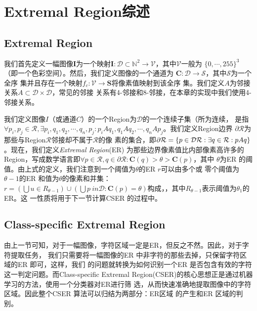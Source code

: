 \section{Extremal Region综述}

\subsection{Extremal Region}

我们首先定义一幅图像$\mathbf{I}$为一个映射$\mathbf{I} : \mathcal{D} \subset
\mathbb{N}^2 \rightarrow \mathcal{V}$，其中$\mathcal{V}$一般为
$\{0,\cdots,255\}^3$（即一个色彩空间）。然后，我们定义图像的一个通道为
$\mathbf{C} : \mathcal{D} \rightarrow \mathcal{S}$，其中$\mathcal{S}$为一个全序
集并且存在一个映射$f_c : \mathcal{V} \rightarrow \mathbf{S}$将像素值映射到该全序
集。我们定义$A$为邻接关系$A \subset \mathcal{D} \times \mathcal{D}$，常见的邻接
关系有4-邻接和8-邻接，在本章的实现中我们使用4-邻接关系。

我们定义图像$I$（或通道$C$）的一个Region为$\mathcal{D}$的一个连续子集（所为连续，
是指$\forall{p_i, p_j \in \mathcal{R}}, \exists{p_i, q_1, q_2, \cdots, q_n,
  p_j} : p_iAq_1, q_1Aq_2,\cdots,q_nAp_j$。我们定义Region边界
$\partial{\mathcal{R}}$为那些与Region$\mathcal{R}$邻接却不属于$\mathcal{R}$的像
素的集合，即$\partial{\mathcal{R}} = \{p \in \mathcal{D} \\ \mathcal{R} :
\exists{q \in \mathcal{R}} : pAq \}$。现在，我们定义\textit{Extremal Region}(ER)
为那些边界像素值比内部像素高许多的Region，写成数学语言即$\forall{p \in
  \mathcal{R}}, q \in \partial{\mathcal{R}} : \mathbf{C}(q) > \theta > \mathbf{C}(p)$，其中
$\theta$为ER 的阈值。由上式的定义，我们注意到一个阈值为$\theta$的ER $r$可以由多个或
零个阈值为$\theta - 1$的ER 和值为$\theta$的像素和并集：$r = \left( \bigcup{u \in
    R_{\theta-1}} \right) \cup \left( \bigcup{p \ in \mathcal{D} : \mathbf{C}(p)
  = \theta} \right)$构成，，其中\(R_{\theta-1}\)表示阈值为\(\theta_1\)的 ER。这
一性质将用于下一节计算CSER 的过程中。

\subsection{Class-specific Extremal Region}

由上一节可知，对于一幅图像，字符区域一定是ER，但反之不然。因此，对于字符提取任务，
我们只需要将一幅图像的ER 中非字符的那些去掉，只保留字符区域的ER 即可，这样，我们
的问题就转换为如何识别一个ER 是否包含有效的字符这一判定问题。而Class-specific
Extremal Region(CSER)\cite{Neumann:2012ik}的核心思想正是通过机器学习的方法，使用一个分类器对ER进行筛
选，从而快速准确地提取图像中的字符区域。因此整个CSER 算法可以归结为两部分：ER区域
的产生和ER 区域的判别。

